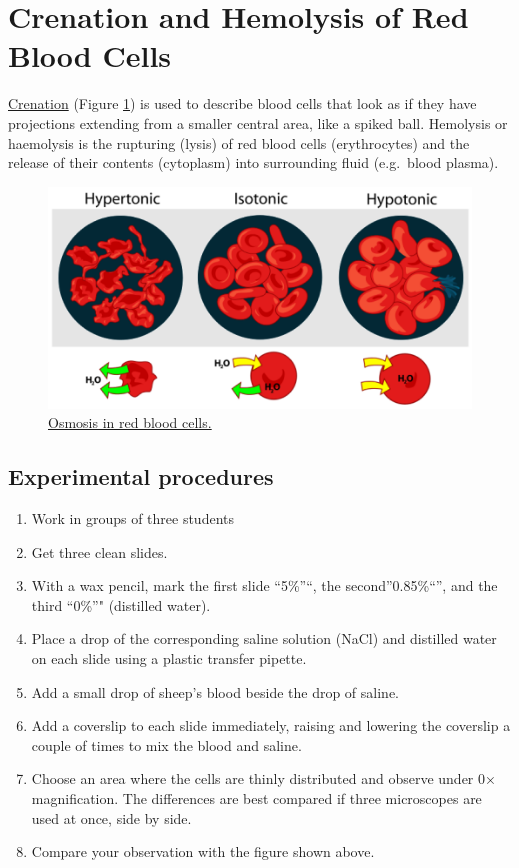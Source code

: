 \section{Crenation and Hemolysis of Red Blood
Cells}\label{crenation-and-hemolysis-of-red-blood-cells}

\href{https://en.wikipedia.org/wiki/Crenation}{Crenation} (Figure
\ref{fig:osmosisb}) is used to describe blood cells that look as if they
have projections extending from a smaller central area, like a spiked
ball. Hemolysis or haemolysis is the rupturing (lysis) of red blood
cells (erythrocytes) and the release of their contents (cytoplasm) into
surrounding fluid (e.g.~blood plasma).

\begin{figure}

{\centering \includegraphics[width=0.7\linewidth]{./figures/exchange/Osmosis_blood}

}

\caption{\href{https://commons.wikimedia.org/wiki/File:Osmotic_pressure_on_blood_cells_diagram.svg}{Osmosis
in red blood cells.}}\label{fig:osmosisb}
\end{figure}

\subsection{Experimental procedures}\label{experimental-procedures-15}

\begin{enumerate}
\def\labelenumi{\arabic{enumi}.}
\tightlist
\item
  Work in groups of three students
\item
  Get three clean slides.
\item
  With a wax pencil, mark the first slide ``5\%''``, the
  second''0.85\%``'', and the third ``0\%''" (distilled water).
\item
  Place a drop of the corresponding saline solution (NaCl) and distilled
  water on each slide using a plastic transfer pipette.
\item
  Add a small drop of sheep's blood beside the drop of saline.
\item
  Add a coverslip to each slide immediately, raising and lowering the
  coverslip a couple of times to mix the blood and saline.
\item
  Choose an area where the cells are thinly distributed and observe
  under 0× magnification. The differences are best compared if three
  microscopes are used at once, side by side.
\item
  Compare your observation with the figure shown above.
\end{enumerate}

